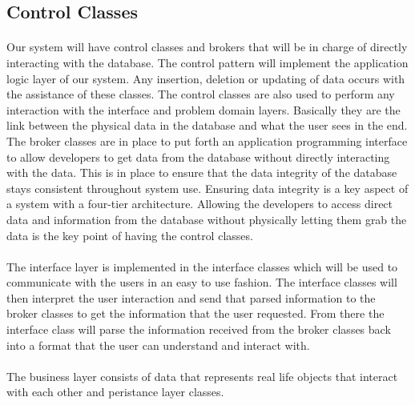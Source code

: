 \documentclass[letterpaper,12pt]{report}
\begin{document}
\subsection*{Control Classes}
\paragraph*{}\hspace{0.6cm}Our system will have control classes and brokers that will be in charge of directly interacting with the database. The control pattern will implement the application logic layer of our system. Any insertion, deletion or updating of data occurs with the assistance of these classes. The control classes are also used to perform any interaction with the interface and problem domain layers. Basically they are the link between the physical data in the database and what the user sees in the end. The broker classes are in place to put forth an application programming interface to allow developers to get data from the database without directly interacting with the data. This is in place to ensure that the data integrity of the database stays consistent throughout system use. Ensuring data integrity is a key aspect of a system with a four-tier architecture. Allowing the developers to access direct data and information from the database without physically letting them grab the data is the key point of having the control classes.\newline
\paragraph*{}\hspace{0.6cm}The interface layer is implemented in the interface classes which will be used to communicate with the users in an easy to use fashion. The interface classes will then interpret the user interaction and send that parsed information to the broker classes to get the information that the user requested. From there the interface class will parse the information received from the broker classes back into a format that the user can understand and interact with.\newline
\paragraph*{}\hspace{0.6cm}The business layer consists of data that represents real life objects that interact with each other and peristance layer classes.
\end{document}
